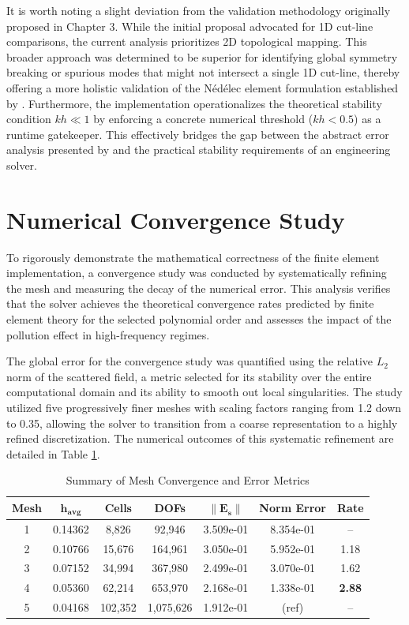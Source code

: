 \documentclass[class=report, crop=false]{standalone}
\begin{document}
It is worth noting a slight deviation from the validation methodology originally proposed in Chapter 3. While the initial proposal advocated for 1D cut-line comparisons, the current analysis prioritizes 2D topological mapping. This broader approach was determined to be superior for identifying global symmetry breaking or spurious modes that might not intersect a single 1D cut-line, thereby offering a more holistic validation of the Nédélec element formulation established by \citet{Bossavit1989}. Furthermore, the implementation operationalizes the theoretical stability condition $kh \ll 1$ by enforcing a concrete numerical threshold ($kh < 0.5$) as a runtime gatekeeper. This effectively bridges the gap between the abstract error analysis presented by \citet{Melenk2024} and the practical stability requirements of an engineering solver.

\section{Numerical Convergence Study}

To rigorously demonstrate the mathematical correctness of the finite element implementation, a convergence study was conducted by systematically refining the mesh and measuring the decay of the numerical error. This analysis verifies that the solver achieves the theoretical convergence rates predicted by finite element theory for the selected polynomial order and assesses the impact of the pollution effect in high-frequency regimes.

The global error for the convergence study was quantified using the relative $L_2$ norm of the scattered field, a metric selected for its stability over the entire computational domain and its ability to smooth out local singularities. The study utilized five progressively finer meshes with scaling factors ranging from 1.2 down to 0.35, allowing the solver to transition from a coarse representation to a highly refined discretization. The numerical outcomes of this systematic refinement are detailed in Table \ref{tab:convergence_summary}.

\begin{table}[H]
\centering
\caption{Summary of Mesh Convergence and Error Metrics}
\label{tab:convergence_summary}
\begin{tabular}{ccccccc}
\hline
\textbf{Mesh} & $\bm{h_{\text{avg}}}$ & \textbf{Cells} & \textbf{DOFs} & $\bm{\|\bm{E}_s\|}$ & \textbf{Norm Error} & \textbf{Rate} \\
\hline
1 & 0.14362 & 8,826 & 92,946 & 3.509e-01 & 8.354e-01 & -- \\
2 & 0.10766 & 15,676 & 164,961 & 3.050e-01 & 5.952e-01 & 1.18 \\
3 & 0.07152 & 34,994 & 367,980 & 2.499e-01 & 3.070e-01 & 1.62 \\
4 & 0.05360 & 62,214 & 653,970 & 2.168e-01 & 1.338e-01 & \textbf{2.88} \\
5 & 0.04168 & 102,352 & 1,075,626 & 1.912e-01 & (ref) & -- \\
\hline
\end{tabular}
\end{table}
\end{document}
